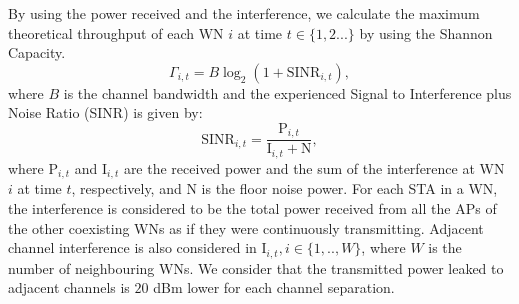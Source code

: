 \documentclass{article}
\begin{document}
	By using the power received and the interference, we calculate the maximum theoretical throughput of each WN $i$ at time $t \in \{1,2 ...\}$ by using the Shannon Capacity.
	\begin{equation}
	\Gamma_{i,t} = B  \log_{2}(1 + \text{SINR}_{i, t}),
	\nonumber
	\label{eq:shannon_capacity}
	\end{equation}
	where $B$ is the channel bandwidth and the experienced Signal to Interference plus Noise Ratio (SINR) is given by:
	\begin{equation}
	\text{SINR}_{i,t} = \frac{\text{P}_{i,t}}{\text{I}_{i,t}+\text{N}},
	\nonumber
	\label{eq:sinr}
	\end{equation}
	where $\text{P}_{i,t}$ and $\text{I}_{i,t}$ are the received power and the sum of the interference at WN $i$ at time $t$, respectively, and N is the floor noise power. For each STA in a WN, the interference is considered to be the total power received from all the APs of the other coexisting WNs as if they were continuously transmitting. Adjacent channel interference is also considered in $\text{I}_{i,t}, i \in \{1,..,W\}$, where $W$ is the number of neighbouring WNs. We consider that the transmitted power leaked to adjacent channels is $20$ dBm lower for each channel separation.	
	
\end{document}
